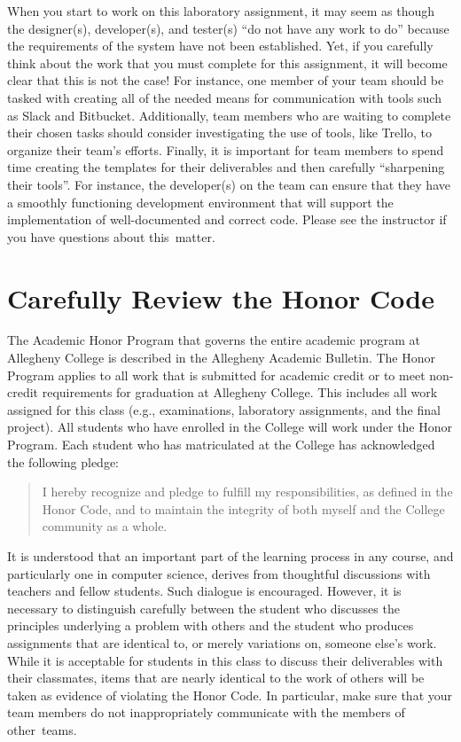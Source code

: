 When you start to work on this laboratory assignment, it may seem as though the designer(s), developer(s), and tester(s)
``do not have any work to do'' because the requirements of the system have not been established. Yet, if you carefully
think about the work that you must complete for this assignment, it will become clear that this is not the case! For
instance, one member of your team should be tasked with creating all of the needed means for communication with tools
such as Slack and Bitbucket. Additionally, team members who are waiting to complete their chosen tasks should consider
investigating the use of tools, like Trello, to organize their team's efforts. Finally, it is important for team
members to spend time creating the templates for their deliverables and then carefully ``sharpening their tools''. For
instance, the developer(s) on the team can ensure that they have a smoothly functioning development environment that
will support the implementation of well-documented and correct code. Please see the instructor if you have questions
about \mbox{this matter}.

\section*{Carefully Review the Honor Code}

The Academic Honor Program that governs the entire academic program at Allegheny College is described in the Allegheny
Academic Bulletin.  The Honor Program applies to all work that is submitted for academic credit or to meet non-credit
requirements for graduation at Allegheny College.  This includes all work assigned for this class (e.g., examinations,
  laboratory assignments, and the final project).  All students who have enrolled in the College will work under the Honor
Program.  Each student who has matriculated at the College has acknowledged the following pledge:

\vspace*{-.05in}
\begin{quote}
  I hereby recognize and pledge to fulfill my responsibilities, as defined in the Honor Code, and to maintain the
  integrity of both myself and the College community as a whole.
\end{quote}
\vspace*{-.05in}

\noindent It is understood that an important part of the learning process in any course, and particularly one in
computer science, derives from thoughtful discussions with teachers and fellow students.  Such dialogue is encouraged.
However, it is necessary to distinguish carefully between the student who discusses the principles underlying a problem
with others and the student who produces assignments that are identical to, or merely variations on, someone else's
work.  While it is acceptable for students in this class to discuss their deliverables with their classmates, items that
are nearly identical to the work of others will be taken as evidence of violating the Honor Code. In particular, make
sure that your team members do not inappropriately communicate with the members of \mbox{other teams}.

